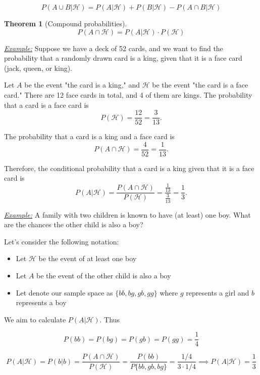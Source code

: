 \documentclass[a4paper,10pt]{article}
\newtheorem{theorem}{Theorem}
\begin{document}
\begin{equation}
    P(A \cup B | \mathcal{H}) = P(A | \mathcal{H}) + P(B | \mathcal{H}) - P(A \cap B | \mathcal{H})
\end{equation}

\begin{theorem}[Compound probabilities]
    \begin{equation}
        P(A \cap \mathcal{H}) = P(A | \mathcal{H}) \cdot P(\mathcal{H})
    \end{equation}
\end{theorem}

\noindent\textit{\underline{Example:}} Suppose we have a deck of 52 cards, and we want to find the probability that a randomly drawn card is a king, given that it is a face card (jack, queen, or king). 

Let $A$ be the event "the card is a king," and $\mathcal{H}$ be the event "the card is a face card." There are 12 face cards in total, and 4 of them are kings. The probability that a card is a face card is
$$
P(\mathcal{H}) = \frac{12}{52} = \frac{3}{13}.
$$

The probability that a card is a king and a face card is
$$
P(A \cap \mathcal{H}) = \frac{4}{52} = \frac{1}{13}.
$$

Therefore, the conditional probability that a card is a king given that it is a face card is
$$
P(A | \mathcal{H}) = \frac{P(A \cap \mathcal{H})}{P(\mathcal{H})} = \frac{\frac{1}{13}}{\frac{3}{13}} = \frac{1}{3}.
$$

\noindent\textit{\underline{Example:}} A family with two children is known to have (at least) one boy. What are the chances the other child is also a boy?

Let's consider the following notation:

\begin{itemize}
    \item Let $\mathcal{H}$ be the event of at least one boy
    \item Let $A$ be the event of the other child is also a boy
    \item Let denote our sample space as $\{bb, bg, gb, gg\}$ where $g$ represents a girl and $b$ represents a boy
\end{itemize}

We aim to calculate $P(A | \mathcal{H})$. Thus

$$
    P(bb) = P(bg) = P(gb) = P(gg) = \frac{1}{4}
$$

$$
    P(A | \mathcal{H}) = P(b | b) = \frac{P(A \cap \mathcal{H})}{P(\mathcal{H})} = \frac{P(bb)}{P\{bb, gb, bg\}} = \frac{1/4}{3 \cdot 1/4} \implies P(A | \mathcal{H}) = \frac{1}{3}
$$
\end{document}
